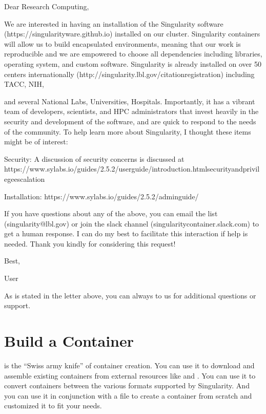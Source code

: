 \documentclass[letterpaper,10pt,english]{sphinxmanual}
\begin{document}
%
\begin{sphinxVerbatim}[commandchars=\\\{\}]
Dear Research Computing,


We are interested in having an installation of the Singularity software (https://singularityware.github.io) installed on our cluster. Singularity containers will allow us to build encapsulated environments, meaning that our work is reproducible and we are empowered to choose all dependencies including libraries, operating system, and custom software. Singularity is already installed on over 50 centers internationally (http://singularity.lbl.gov/citation\PYGZhy{}registration) including TACC, NIH,

and several National Labs, Universities, Hospitals. Importantly, it has a vibrant team of developers, scientists, and HPC administrators that invest heavily in the security and development of the software, and are quick to respond to the needs of the community. To help learn more about Singularity, I thought these items might be of interest:


  \PYGZhy{} Security: A discussion of security concerns is discussed at https://www.sylabs.io/guides/2.5.2/user\PYGZhy{}guide/introduction.html\PYGZsh{}security\PYGZhy{}and\PYGZhy{}privilege\PYGZhy{}escalation

  \PYGZhy{} Installation: https://www.sylabs.io/guides/2.5.2/admin\PYGZhy{}guide/


If you have questions about any of the above, you can email the list (singularity@lbl.gov) or join the slack channel (singularity\PYGZhy{}container.slack.com) to get a human response. I can do my best to facilitate this interaction if help is needed. Thank you kindly for considering this request!

Best,

User
\end{sphinxVerbatim}

As is stated in the letter above, you can always  to us for additional questions or support.


\chapter{Build a Container}
\label{\detokenize{build_a_container:build-a-container}}\label{\detokenize{build_a_container:id1}}\label{\detokenize{build_a_container::doc}}\label{\detokenize{build_a_container:sec-buildcontainer}}
 is the “Swiss army knife” of container creation. You can use it to
download and assemble existing containers from external resources like
 and . You can use it to convert
containers between the various formats supported by Singularity. And you
can use it in conjunction with a {\hyperref[\detokenize{container_recipes:container-recipes}]{}} file to
create a container from scratch and customized it to fit your needs.
\end{document}
